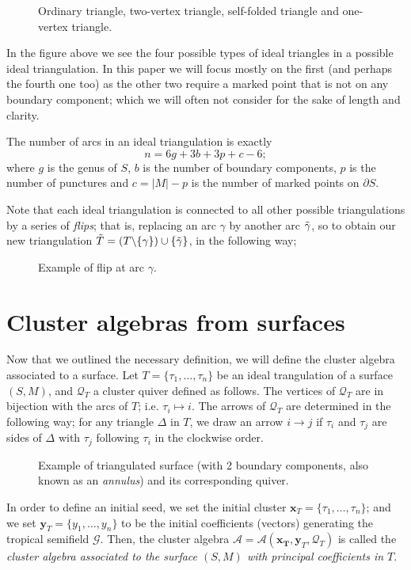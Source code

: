 \begin{figure}[H]
    \centering
    
    \caption{Ordinary triangle, two-vertex triangle, self-folded triangle and one-vertex triangle.}
\end{figure}
In the figure above we see the four possible types of ideal triangles in a possible ideal triangulation. In this paper we will focus mostly on the first (and perhaps the fourth one too) as the other two require a marked point that is not on any boundary component; which we will often not consider for the sake of length and clarity. 
\begin{theorem}{\normalfont \cite{Sch}}
The number of arcs in an ideal triangulation is exactly
\begin{equation*}
    n = 6g + 3b + 3p + c - 6;
\end{equation*}
where $g$ is the genus of $S$, $b$ is the number of boundary components, $p$ is the number of punctures and $c = |M|-p$ is the number of marked points on $\partial S$.
\end{theorem}
\begin{remark}
Note that each ideal triangulation is connected to all other possible triangulations by a series of \emph{flips}; that is, replacing an arc $\gamma$ by another arc $\Tilde{\gamma}$, so to obtain our new triangulation $\Tilde{T} = (T\backslash\{\gamma\}) \cup \{\Tilde{\gamma}\}$, in the following way; 
\begin{figure}[H]
    \centering
    
    \caption{Example of flip at arc $\gamma$.}
\end{figure}
\end{remark}


\section{Cluster algebras from surfaces}
Now that we outlined the necessary definition, we will define the cluster algebra associated to a surface.
Let $T = \{\tau_1, \dots, \tau_n\}$ be an ideal trangulation of a surface $(S,M)$, and $\mathcal{Q}_T$ a cluster quiver defined as follows.
The vertices of $\mathcal{Q}_T$ are in bijection with the arcs of $T$; i.e. $\tau_i \mapsto i$. The arrows of $\mathcal{Q}_T$ are determined in the following way; for any triangle $\Delta$ in $T$, we draw an arrow $i \to j$ if $\tau_i$ and $\tau_j$ are sides of $\Delta$ with $\tau_j$ following $\tau_i$ in the clockwise order.
\begin{figure}[H]
    \centering
    
    \caption{Example of triangulated surface (with 2 boundary components, also known as an \emph{annulus}) and its corresponding quiver.}
\end{figure}
In order to define an initial seed, we set the initial cluster $\mathbf{x}_T = \{\tau_1,\dots,\tau_n\}$; and we set $\mathbf{y}_T = \{y_1,\dots,y_n\}$ to be the initial coefficients (vectors) generating the tropical semifield $\mathcal{G}$.
Then, the cluster algebra $\mathcal{A} = \mathcal{A}(\mathbf{x_T},\mathbf{y}_T,\mathcal{Q}_T)$ is called the \emph{cluster algebra associated to the surface $(S,M)$ with principal coefficients in $T$}.

